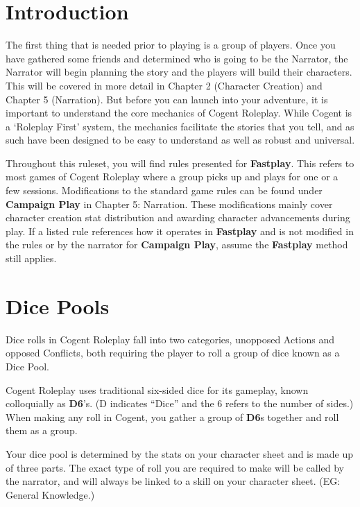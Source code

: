 \section{Introduction} \label{sec:introduction}

The first thing that is needed prior to playing is a group of players. Once you have gathered some friends and determined who is going to be the Narrator, the Narrator will begin planning the story and the players will build their characters. This will be covered in more detail in Chapter 2 (Character Creation) and Chapter 5 (Narration). But before you can launch into your adventure, it is important to understand the core mechanics of Cogent Roleplay. While Cogent is a ‘Roleplay First’ system, the mechanics facilitate the stories that you tell, and as such have been designed to be easy to understand as well as robust and universal.

Throughout this ruleset, you will find rules presented for \textbf{Fastplay}. This refers to most games of Cogent Roleplay where a group picks up and plays for one or a few sessions. Modifications to the standard game rules can be found under \textbf{Campaign Play} in Chapter 5: Narration. These modifications mainly cover character creation stat distribution and awarding character advancements during play. If a listed rule references how it operates in \textbf{Fastplay} and is not modified in the rules or by the narrator for \textbf{Campaign Play}, assume the \textbf{Fastplay} method still applies.

\section{Dice Pools} \label{sec:dice_pools}

Dice rolls in Cogent Roleplay fall into two categories, unopposed Actions and opposed Conflicts, both requiring the player to roll a group of dice known as a Dice Pool.

Cogent Roleplay uses traditional six-sided dice for its gameplay, known colloquially as \textbf{D6}’s. (D indicates “Dice” and the 6 refers to the number of sides.) When making any roll in Cogent, you gather a group of \textbf{D6}s together and roll them as a group.

Your dice pool is determined by the stats on your character sheet and is made up of three parts. The exact type of roll you are required to make will be called by the narrator, and will always be linked to a skill on your character sheet. (EG: General Knowledge.)

